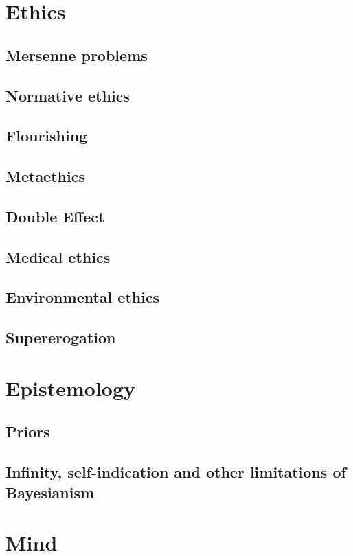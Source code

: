 \def\mychapter{II}

\chapter{Ethics}\label{ch:ethics}
\section{Mersenne problems}
\section{Normative ethics}
\section{Flourishing}
\section{Metaethics}
\section{Double Effect}
\section{Medical ethics}
\section{Environmental ethics}
\section{Supererogation}
\chaptertail 

\def\mychapter{III}

\chapter{Epistemology}\label{ch:epistemology}
\section{Priors}
\section{Infinity, self-indication and other limitations of Bayesianism}
\chaptertail 

\def\mychapter{IV}

\chapter{Mind}\label{ch:mind}
\chaptertail 

